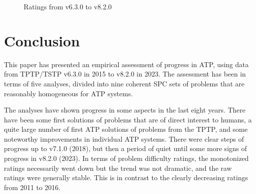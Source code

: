 \documentclass[runningheads]{llncs}
\begin{document}
\begin{figure}[t!]
\begin{minipage}[t]{.49\textwidth}
  \vspace*{-2em}
  \caption{Ratings from v6.3.0 to v8.2.0}
  \label{Ratings_v6.3.0_v8.2.0}
\end{minipage}
\end{figure}

\section{Conclusion}
\label{Conclusion}

This paper has presented an empirical assessment of progress in ATP, using data from TPTP/TSTP
v6.3.0 in 2015 to v8.2.0 in 2023.
The assessment has been in terms of five analyses, divided into nine coherent SPC sets of problems
that are reasonably homogeneous for ATP systems.

The analyses have shown progress in some aspects in the last eight years.
There have been some first solutions of problems that are of direct interest to humans, 
a quite large number of first ATP solutions of problems from the TPTP, and 
some noteworthy improvements in individual ATP systems.
There were clear steps of progress up to v7.1.0 (2018), but then a period of quiet until some
more signs of progress in v8.2.0 (2023).
In terms of problem difficulty ratings, the monotonized ratings necessarily went down but the 
trend was not dramatic, and the raw ratings were generally stable.
This is in contrast to the clearly decreasing ratings from 2011 to 2016.
\end{document}
